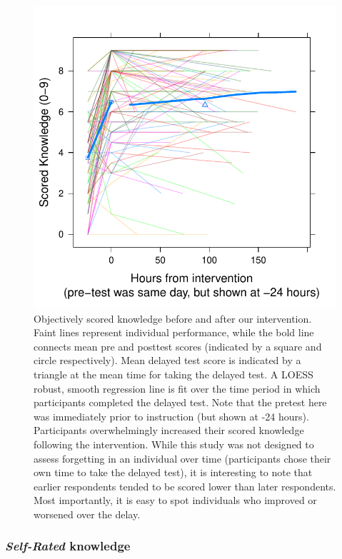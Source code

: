 \begin{figure}
    \centering
    \includegraphics{RPP-mech-scored.pdf}
    \caption{Objectively scored knowledge before and after our intervention.
        Faint lines represent individual performance, while the bold line
        connects mean pre and posttest scores (indicated by a square and circle
        respectively). Mean delayed test score is indicated by a triangle at the
        mean time for taking the delayed test. A LOESS robust, smooth regression
        line is fit over the time period in which participants completed the
        delayed test.  Note that the pretest here was immediately prior to
        instruction (but shown at -24 hours). Participants overwhelmingly
        increased their scored knowledge following the intervention. While this
        study was not designed to assess forgetting in an individual over time
        (participants chose their own time to take the delayed test), it is
        interesting to note that earlier respondents tended to be scored lower
        than later respondents.  Most importantly, it is easy to spot
        individuals who improved or worsened over the delay.}
    \label{fig:RPP-mech-scored}
\end{figure}

\subsubsection{\emph{Self-Rated} knowledge}


